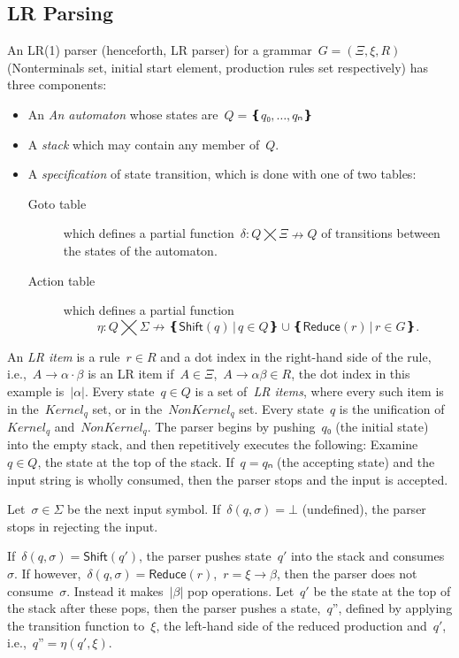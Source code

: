 \subsection{LR Parsing}
An LR(1) parser (henceforth, LR parser) for a grammar~$G=(Ξ,ξ,R)$
(Nonterminals set, initial start element, production rules set respectively)
has three components:
\begin{itemize}
  \item An \emph{An automaton} whose states are~$Q=❴q₀,…,qₙ❵$
  \item A \emph{stack} which may contain any member of~$Q$.
  \item A \emph{specification} of state transition,
        which is done with one of two tables:
        \begin{description}
          \item[Goto table] which defines a partial function~$δ:Q⨉Ξ↛Q$ of transitions
                between the states of the automaton.
          \item[Action table] which
                defines a partial function\[η:Q⨉Σ↛ ❴ \textsf{Shift}(q) \,|\, q∈Q❵ ∪ ❴\textsf{Reduce}(r) \,| \, r∈G❵.\]
        \end{description}
\end{itemize}
An \emph{LR item} is a rule~$r∈R$ and a dot index in the right-hand side of the rule,
i.e.,~$A→α·β$ is an LR item if~$A∈Ξ$,~$A→αβ∈R$,
the dot index in this example is~$|α|$.
Every state~$q∈Q$ is a set of~\emph{LR items},
where every such item is in the~$Kernel_{q}$ set,
or in the~$NonKernel_{q}$ set.
Every state~$q$ is the unification of~$Kernel_{q}$ and~$NonKernel_{q}$.
The parser begins by pushing~$q₀$ (the initial state) into the empty stack,
and then repetitively executes the following:
Examine~$q∈Q$, the state at the top of the stack.
If~$q=qₙ$ (the accepting state) and the input string is wholly consumed, then the parser stops and the input is accepted.

Let~$σ∈Σ$ be the next input symbol.
If~$δ(q,σ)=⊥$ (undefined), the parser stops in rejecting the input.

If~$δ(q,σ) = \textsf{Shift}(q')$, the parser pushes state~$q'$
into the stack and consumes~$σ$.
If however,~$δ(q,σ) = \textsf{Reduce}(r)$,~$r=ξ→β$,
then the parser does not consume~$σ$.
Instead it makes~$|β|$ pop operations.
Let~$q'$ be the state at the top of the stack after these pops, then
the parser pushes a state,~$q”$,
defined by applying the transition function to~$ξ$, the left-hand side of the reduced production and~$q'$,
i.e.,~$q”=η(q',ξ)$.

